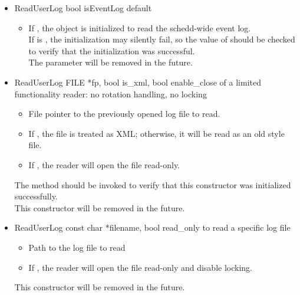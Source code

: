 \begin{itemize}

\item \Constructor
  {ReadUserLog}
  {bool isEventLog}
  {default}
  \begin{itemize}
  \item {}
    If , the  object is
    initialized to read the schedd-wide event log.
    \\ \Note If  is , the initialization may
    silently fail, so the value of 
    should be checked to verify that the initialization was successful.
    \\ \Note The  parameter will be removed in the future.
  \end{itemize}

\item \Constructor
  {ReadUserLog}
  {FILE *fp, bool is\_xml, bool enable\_close}
  {of a limited functionality reader: no rotation handling, no locking}
  \begin{itemize}
  \item {}
    File pointer to the previously opened log file to read.
  \item {}
    If , the file is treated as XML; otherwise, it will be
    read as an old style file.
  \item {}
    If , the reader will open the file read-only.
  \end{itemize}
  \Note The  method
  should be invoked to verify that this constructor was initialized
  successfully.
  \\ \Note This constructor will be removed in the future.

\item \Constructor
  {ReadUserLog}
  {const char *filename, bool read\_only}
  {to read a specific log file}
  \begin{itemize}
  \item {}
    Path to the log file to read
  \item {}
    If , the reader will open the file read-only and
    disable locking.
  \end{itemize}
  \Note This constructor will be removed in the future.


\end{itemize}
